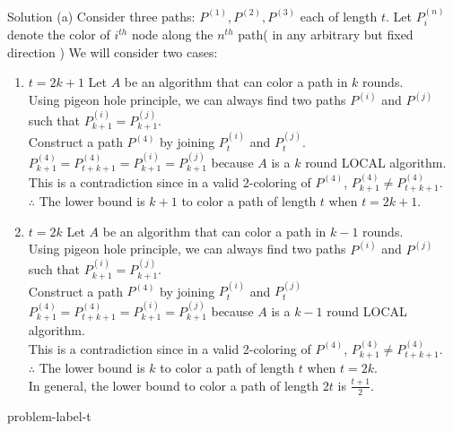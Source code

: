 \begin{solution*}{Solution (a)}{}
Consider three paths: $P^{(1)}, P^{(2)}, P^{(3)}$ each of length $t$. Let $P^{(n)}_{i}$ denote the color of $i^{th}$ node along the $n^{th}$ path( in any arbitrary but fixed direction )
We will consider two cases:
	\begin{enumerate}[label=(\roman*)]
		\item $t = 2k + 1 $ \newline
			Let $A$ be an algorithm that can color a path in $k$ rounds. \\
			Using pigeon hole principle, we can always find two paths $P^{(i)}$ and $P^{(j)}$ such that 
			$P^{(i)}_{k+1} = P^{(j)}_{k+1}$. \\
			Construct a path $P^{(4)}$ by joining $P^{(i)}_t$ and $P^{(j)}_t$. \\
			$P^{(4)}_{k+1} = P^{(4)}_{t+k+1}  = P^{(i)}_{k+1} = P^{(j)}_{k+1}$ because $A$ is a $k$ round LOCAL algorithm. \\
			This is a contradiction since in a valid 2-coloring of $P^{(4)}$, $P^{(4)}_{k+1} \neq P^{(4)}_{t+k+1}$. \\
		\( \therefore \) The lower bound is $k+1$ to color a path of length $t$ when $t=2k+1$.
		\item $t = 2k$ \newline
			Let $A$ be an algorithm that can color a path in $k-1$ rounds. \\
			Using pigeon hole principle, we can always find two paths $P^{(i)}$ and $P^{(j)}$ such that 
			$P^{(i)}_{k+1} = P^{(j)}_{k+1}$. \\
			Construct a path $P^{(4)}$ by joining $P^{(i)}_t$ and $P^{(j)}_t$\\
			$P^{(4)}_{k+1} = P^{(4)}_{t+k+1}  = P^{(i)}_{k+1} = P^{(j)}_{k+1}$ because $A$ is a $k-1$ round LOCAL algorithm. \\
			This is a contradiction since in a valid 2-coloring of $P^{(4)}$, $P^{(4)}_{k+1} \neq P^{(4)}_{t+k+1}$. \\
		\( \therefore \) The lower bound is $k$ to color a path of length $t$ when $t=2k$. \\
		\newline
		In general, the lower bound to color a path of length $2t$ is $\frac{t+1}{2}$.
\end{enumerate}
\end{solution*}

\begin{problem}{}{problem-label-t}
\end{problem}

